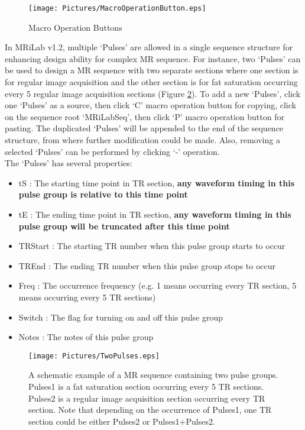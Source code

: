 \documentclass{book}%
\begin{document}
\begin{enumerate}
\begin{figure}[htbp]
	\centering
		\texttt{[image: Pictures/MacroOperationButton.eps]}
	\caption{Macro Operation Buttons}
	\label{fig:MacroOperationButton}
\end{figure}

In MRiLab v1.2, multiple `Pulses' are allowed in a single sequence structure for enhancing design ability for complex MR sequence. For instance, two `Pulses' can be used to design a MR sequence with two separate sections where one section is for regular image acquisition and the other section is for fat saturation occurring every 5 regular image acquisition sections (Figure \ref{fig:TwoPulses}). To add a new `Pulses', click one `Pulses' as a source, then click `C' macro operation button for copying, click on the sequence root `MRiLabSeq', then click `P' macro operation button for pasting. The duplicated `Pulses' will be appended to the end of the sequence structure, from where further modification could be made. Also, removing a selected `Pulses' can be performed by clicking `-' operation. \\

The `Pulses' has several properties: 

\begin{itemize}
	\item tS : The starting time point in TR section, \textbf{any waveform timing in this pulse group is relative to this time point}
	\item tE : The ending time point in TR section, \textbf{any waveform timing in this pulse group will be truncated after this time point}
	\item TRStart : The starting TR number when this pulse group starts to occur
	\item TREnd : The ending TR number when this pulse group stops to occur
	\item Freq : The occurrence frequency (e.g. 1 means occurring every TR section, 5 means occurring every 5 TR sections)
	\item Switch : The flag for turning on and off this pulse group
	\item Notes : The notes of this pulse group
\end{itemize}

\begin{figure}[htbp]
	\centering
		\texttt{[image: Pictures/TwoPulses.eps]}
	\caption{A schematic example of a MR sequence containing two pulse groups. Pulses1 is a fat saturation section occurring every 5 TR sections. Pulses2 is a regular image acquisition section occurring every TR section. Note that depending on the occurrence of Pulses1, one TR section could be either Pulses2 or Pulses1+Pulses2.}
	\label{fig:TwoPulses}
\end{figure}


\end{enumerate}
\end{document}
